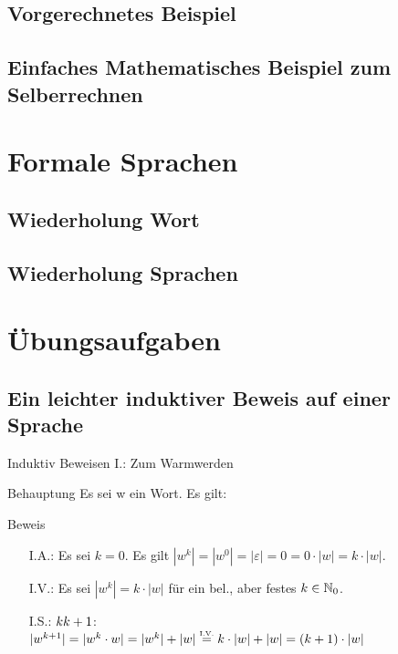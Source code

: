 \subsection{Vorgerechnetes Beispiel}
\subsection{Einfaches Mathematisches Beispiel zum Selberrechnen}

\section{Formale Sprachen}
\subsection{Wiederholung Wort} %
\subsection{Wiederholung Sprachen} %

\section{Übungsaufgaben}
\subsection{Ein leichter induktiver Beweis auf einer Sprache}
\begin{frame}{Induktiv Beweisen I.: Zum Warmwerden}
	\begin{exampleblock}{Behauptung}
		Es sei w ein Wort. Es gilt:\\
	\end{exampleblock}
\pause
	\begin{block}{Beweis}
		\begin{itemize}
			\item[I.A.:] Es sei $k=0$. Es gilt $|w^k|=|w^0|=|\varepsilon|=0=0 \cdot |w| = k \cdot |w|$.
			\item[I.V.:] Es sei $|w^k|=k \cdot |w|$ für ein bel., aber festes $k\in \mathbb{N}_0$.
			\item[I.S.:] $k \Stephan{\curvearrowright} \notStephan{\leadsto} k+1$:\\
						 $|w^{k+1}|=|w^k \cdot w|=|w^k|+|w| \eqtext{I.V.} k \cdot |w| + |w| = (k+1) \cdot |w|$
		\end{itemize}
	\end{block}
\end{frame}
